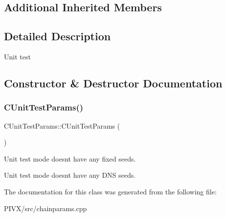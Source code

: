 \subsection*{Additional Inherited Members}


\subsection{Detailed Description}
Unit test 

\subsection{Constructor \& Destructor Documentation}
\mbox{\label{class_c_unit_test_params_a851e71faf703b4e2f611083c79b7eb92}} 
\subsubsection{\texorpdfstring{C\+Unit\+Test\+Params()}{CUnitTestParams()}}
{\footnotesize\ttfamily C\+Unit\+Test\+Params\+::\+C\+Unit\+Test\+Params (\begin{DoxyParamCaption}{ }\end{DoxyParamCaption})\hspace{0.3cm}{\ttfamily [inline]}}

Unit test mode doesn\textquotesingle{}t have any fixed seeds.

Unit test mode doesn\textquotesingle{}t have any D\+NS seeds. 

The documentation for this class was generated from the following file\+:\begin{DoxyCompactItemize}
\item 
P\+I\+V\+X/src/chainparams.\+cpp\end{DoxyCompactItemize}
